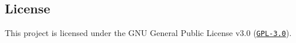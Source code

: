 \documentclass[11pt,a4paper]{article}
\begin{document}
\begin{otherlanguage}{english}
\section*{License}
This project is licensed under the GNU General Public License v3.0 (\href{https://www.gnu.org/licenses/gpl-3.0.en.html}{\texttt{GPL-3.0}}).

%
%



\end{otherlanguage}
\end{document}
